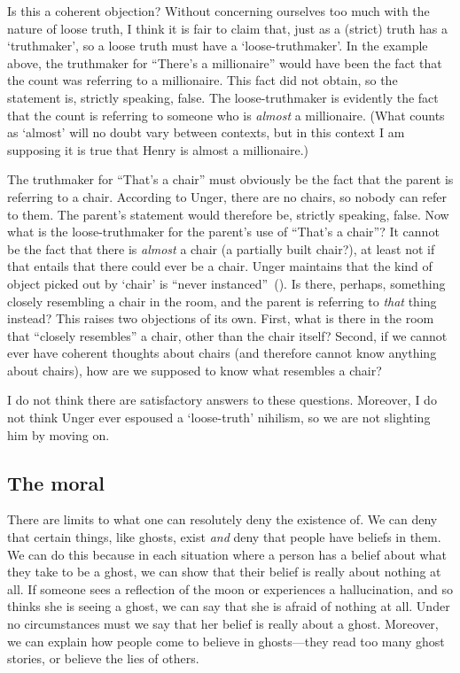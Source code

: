 \documentclass[11pt]{standalone} \newif\ifstandlone \standalonetrue
\begin{document}
\begin{spacing}{1.5}
\begin{enumerate}
Is this a coherent objection?  Without concerning ourselves too much
with the nature of loose truth, I think it is fair to claim that, just
as a (strict) truth has a `truthmaker', so a loose truth must have a
`loose-truthmaker'.  In the example above, the truthmaker for
``There's a millionaire'' would have been the fact that the count was
referring to a millionaire.  This fact did not obtain, so the
statement is, strictly speaking, false.  The loose-truthmaker is
evidently the fact that the count is referring to someone who is {\em
  almost} a millionaire.  (What counts as `almost' will no doubt vary
between contexts, but in this context I am supposing it is true that
Henry is almost a millionaire.)

The truthmaker for ``That's a chair'' must obviously be the fact that
the parent is referring to a chair.  According to Unger, there are no
chairs, so nobody can refer to them.  The parent's statement would
therefore be, strictly speaking, false.  Now what is the
loose-truthmaker for the parent's use of ``That's a chair''?  It cannot
be the fact that there is {\em almost} a chair (a partially built
chair?), at least not if that entails that there could ever be a
chair.  Unger maintains that the kind of object picked out by `chair'
is ``never instanced''~(\citeyear[147]{unger1979}).  Is there,
perhaps, something closely resembling a chair in the room, and the
parent is referring to {\em that} thing instead?  This raises two
objections of its own.  First, what is there in the room that
``closely resembles'' a chair, other than the chair itself?  Second, if
we cannot ever have coherent thoughts about chairs (and therefore
cannot know anything about chairs), how are we supposed to know what
resembles a chair?

I do not think there are satisfactory answers to these questions.
Moreover, I do not think Unger ever espoused a `loose-truth' nihilism,
so we are not slighting him by moving on.

\subsection{The moral}
\label{moral}
There are limits to what one can resolutely deny the existence of.  We
can deny that certain things, like ghosts, exist {\em and} deny that
people have beliefs in them.  We can do this because in each situation
where a person has a belief about what they take to be a ghost, we can
show that their belief is really about nothing at all.  If someone
sees a reflection of the moon or experiences a hallucination, and so
thinks she is seeing a ghost, we can say that she is afraid of nothing
at all.  Under no circumstances must we say that her belief is really
about a ghost.  Moreover, we can explain how people come to believe in
ghosts---they read too many ghost stories, or believe the lies of
others.


\end{enumerate}
\end{spacing}
\end{document}
